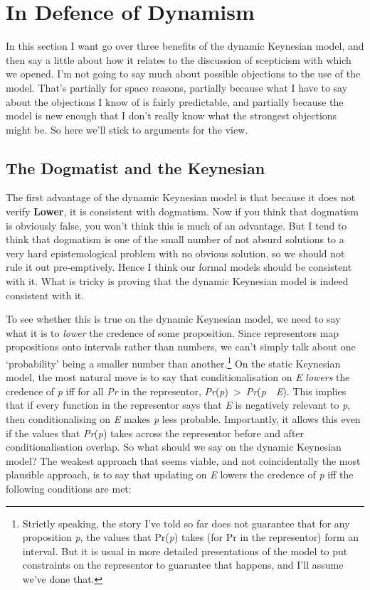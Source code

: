 \documentclass[
  10pt,
  letterpaper,
  DIV=11,
  numbers=noendperiod,
  twoside]{scrartcl}
\begin{document}
\section{In Defence of Dynamism}\label{in-defence-of-dynamism}

In this section I want go over three benefits of the dynamic Keynesian
model, and then say a little about how it relates to the discussion of
scepticism with which we opened. I'm not going to say much about
possible objections to the use of the model. That's partially for space
reasons, partially because what I have to say about the objections I
know of is fairly predictable, and partially because the model is new
enough that I don't really know what the strongest objections might be.
So here we'll stick to arguments for the view.

\subsection{The Dogmatist and the
Keynesian}\label{the-dogmatist-and-the-keynesian}

The first advantage of the dynamic Keynesian model is that because it
does not verify \textbf{Lower}, it is consistent with dogmatism. Now if
you think that dogmatism is obviously false, you won't think this is
much of an advantage. But I tend to think that dogmatism is one of the
small number of not absurd solutions to a very hard epistemological
problem with no obvious solution, so we should not rule it out
pre-emptively. Hence I think our formal models should be consistent with
it. What is tricky is proving that the dynamic Keynesian model is indeed
consistent with it.

To see whether this is true on the dynamic Keynesian model, we need to
say what it is to \emph{lower} the credence of some proposition. Since
representors map propositions onto intervals rather than numbers, we
can't simply talk about one `probability' being a smaller number than
another.\footnote{Strictly speaking, the story I've told so far does not
  guarantee that for any proposition \emph{p}, the values that
  Pr(\emph{p}) takes (for Pr in the representor) form an interval. But
  it is usual in more detailed presentations of the model to put
  constraints on the representor to guarantee that happens, and I'll
  assume we've done that.} On the static Keynesian model, the most
natural move is to say that conditionalisation on \emph{E} \emph{lowers}
the credence of \emph{p} iff for all \emph{Pr} in the representor,
\emph{Pr}(\emph{p})~\textgreater~\emph{Pr}(\emph{p}~\textbar~\emph{E}).
This implies that if every function in the representor says that
\emph{E} is negatively relevant to \emph{p}, then conditionalising on
\emph{E} makes \emph{p} less probable. Importantly, it allows this even
if the values that \emph{Pr}(\emph{p}) takes across the representor
before and after conditionalisation overlap. So what should we say on
the dynamic Keynesian model? The weakest approach that seems viable, and
not coincidentally the most plausible approach, is to say that updating
on \emph{E} lowers the credence of \emph{p} iff the following conditions
are met:
\end{document}
